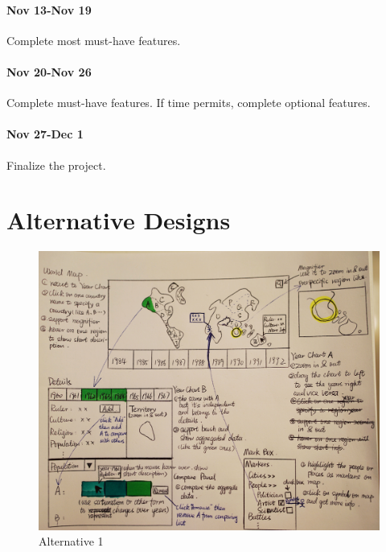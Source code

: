 \documentclass[12pt, fullpage,letterpaper]{article}
\begin{document}
\paragraph{Nov 13-Nov 19} Complete most must-have features.
\paragraph{Nov 20-Nov 26} Complete must-have features. If time permits, complete optional features.
\paragraph{Nov 27-Dec 1} Finalize the project.

\section{Alternative Designs}
\begin{figure}[h!]
    \begin{center}
        \includegraphics[width=\textwidth]{alternative1.JPG}
        \caption{Alternative 1}
        \label{fig:alt1}
    \end{center}
\end{figure}
\end{document}
